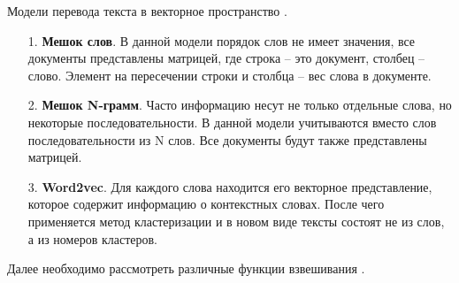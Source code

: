 Модели перевода текста в векторное пространство \cite{indexdocs}.
\begin{enumerate}
\item[1.] \textbf{Мешок слов}.
В данной модели порядок слов не имеет значения, все документы представлены матрицей, где строка -- это документ, столбец -- слово. Элемент на пересечении строки и столбца -- вес слова в документе.
\item[2.] \textbf{Мешок N-грамм}.
Часто информацию несут не только отдельные слова, но некоторые последовательности. В данной модели учитываются вместо слов последовательности из N слов. Все документы будут также представлены матрицей.
\item[3.] \textbf{Word2vec}.
Для каждого слова находится его векторное представление, которое содержит информацию о контекстных словах. После чего применяется метод кластеризации и в новом виде тексты состоят не из слов, а из номеров кластеров.
\end{enumerate}

Далее необходимо рассмотреть различные функции взвешивания \cite{weightsfunc}.

